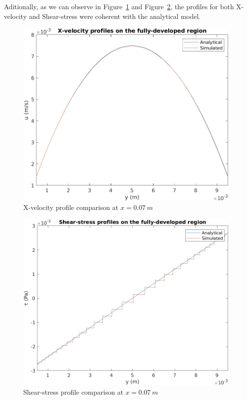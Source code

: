\documentclass[12pt]{article}
\begin{document}
        Aditionally, as we can observe in Figure~\ref{fig:u_comparison} and Figure~\ref{fig:tau_comparison}, the profiles for both X-velocity and Shear-stress were coherent with the analytical model.

        \begin{figure}[!ht]
                \includegraphics[width=\textwidth]{U_Profile_Comparison.png}
                \centering
                \caption{X-velocity profile comparison at \(x = 0.07 \: m \)}
                \label{fig:u_comparison}
        \end{figure}

        \begin{figure}[!ht]
                \includegraphics[width=\textwidth]{Tau_Profile_Comparison.png}
                \centering
                \caption{Shear-stress profile comparison at \(x = 0.07 \: m \)}
                \label{fig:tau_comparison}
        \end{figure}
\end{document}
